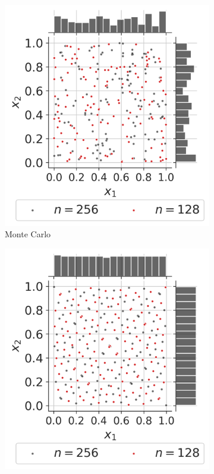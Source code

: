 
\begin{figure}[ht]
    \centering
    \begin{subfigure}[b]{0.32\textwidth}
        \centering
        \includegraphics[width=\textwidth]{../numerical_experiments/chapter1/figures/MonteCarlo256.png}
        \caption{Monte Carlo}
    \end{subfigure}
    \hfill
    \begin{subfigure}[b]{0.32\textwidth}
        \centering
        \includegraphics[width=\textwidth]{../numerical_experiments/chapter1/figures/quasi_MonteCarlo_256.png}

\end{subfigure}
\end{figure}
